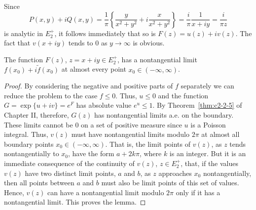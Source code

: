 Since
\[
P(x,y)+iQ(x,y)=\frac{1}{\pi}\left\{\frac{y}{x^{2}+y^{2}}+i\frac{x}{x^{2}+y^{2}}\right\}
=\frac{i}{\pi}\frac{1}{x+iy}=\frac{i}{\pi z}
\]
is analytic in $E_{2}^{+}$, it follows immediately that so is
$F(z) = u(z) + iv(z)$. The fact that $v(x + iy)$ tends to 0 as $y \to \infty$
is obvious.

\begin{lemma}\label{lem:c5-2-6}
The function $F(z)$, $z = x + iy \in E_{2}^{+}$, has a nontangential limit
$f(x_{0}) + i\tilde{f}(x_{0})$ at almost every point
$x_{0} \in (-\infty, \infty)$.
\end{lemma}

\begin{proof}
By considering the negative and positive parts of $f$ separately we can reduce
the problem to the case $f \leq 0$. Thus, $u \leq 0$ and the function
$G = \exp\{u + iv\} = e^{F}$ has absolute value $e^{u} \leq 1$. By
Theorem~\ref{thm:c2-2-5} of Chapter II, therefore, $G(z)$ has nontangential
limits a.e. on the boundary. These limits cannot be 0 on a set of positive
measure since $u$ is a Poisson integral. Thus, $v(z)$ must have nontangential
limits modulo $2\pi$ at almost all boundary points
$x_{0} \in (-\infty, \infty)$. That is, the limit points of $v(z)$, as $z$
tends nontangentially to $x_{0}$, have the form $a + 2k\pi$, where $k$ is an
integer. But it is an immediate consequence of the continuity of $v(z)$,
$z \in E_{2}^{+}$, that, if the values $v(z)$ have two distinct limit points,
$a$ and $b$, as $z$ approaches $x_{0}$ nontangentially, then all points between
$a$ and $b$ must also be limit points of this set of values. Hence, $v(z)$ can
have a nontangential limit modulo $2\pi$ only if it has a nontangential limit.
This proves the lemma.
\end{proof}

